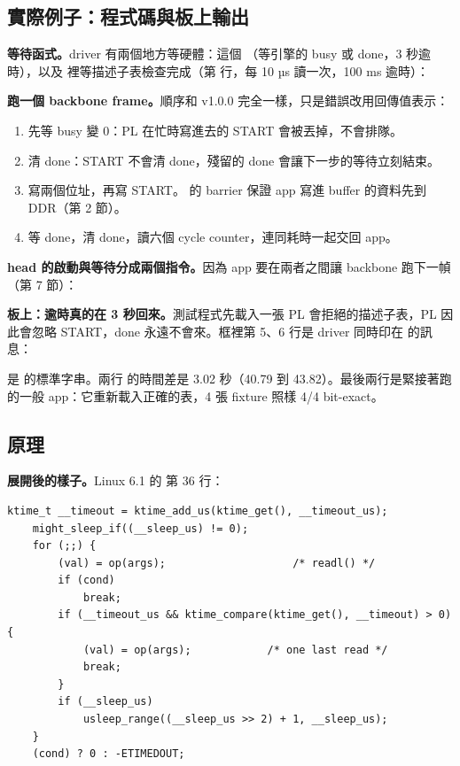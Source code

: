\subsection{實際例子：程式碼與板上輸出}

\textbf{等待函式。}driver 有兩個地方等硬體：這個 （等引擎的 busy 或 done，3 秒逾時），以及  裡等描述子表檢查完成（第  行，每 10 µs 讀一次，100 ms 逾時）：


\textbf{跑一個 backbone frame。}順序和 v1.0.0 完全一樣，只是錯誤改用回傳值表示：


\begin{enumerate}
\item 先等 busy 變 0：PL 在忙時寫進去的 START 會被丟掉，不會排隊。
\item 清 done：START 不會清 done，殘留的 done 會讓下一步的等待立刻結束。
\item 寫兩個位址，再寫 START。 的 barrier 保證 app 寫進 buffer 的資料先到 DDR（第 2 節）。
\item 等 done，清 done，讀六個 cycle counter，連同耗時一起交回 app。
\end{enumerate}

\textbf{head 的啟動與等待分成兩個指令。}因為 app 要在兩者之間讓 backbone 跑下一幀（第 7 節）：


\textbf{板上：逾時真的在 3 秒回來。}測試程式先載入一張 PL 會拒絕的描述子表，PL 因此會忽略 START，done 永遠不會來。框裡第 5、6 行是 driver 同時印在  的訊息：


 是  的標準字串。兩行  的時間差是 3.02 秒（40.79 到 43.82）。最後兩行是緊接著跑的一般 app：它重新載入正確的表，4 張 fixture 照樣 4/4 bit-exact。

\subsection{原理}

\textbf{ 展開後的樣子。}Linux 6.1 的  第 36 行：

\begin{lstlisting}[numbers=none,xleftmargin=0pt,title={\scriptsize\ttfamily include/linux/iopoll.h : 36--58（Linux 6.1，節錄；兩個行尾註解是我加的）}]
	ktime_t __timeout = ktime_add_us(ktime_get(), __timeout_us);
	might_sleep_if((__sleep_us) != 0);
	for (;;) {
		(val) = op(args);                    /* readl() */
		if (cond)
			break;
		if (__timeout_us && ktime_compare(ktime_get(), __timeout) > 0) {
			(val) = op(args);            /* one last read */
			break;
		}
		if (__sleep_us)
			usleep_range((__sleep_us >> 2) + 1, __sleep_us);
	}
	(cond) ? 0 : -ETIMEDOUT;
\end{lstlisting}

